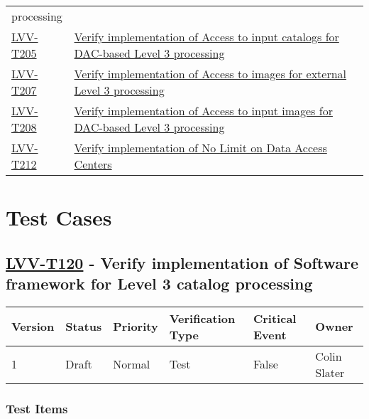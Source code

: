 \begin{longtable}[]{p{3cm}p{13cm}}
{processing}\tabularnewline
\protect\hyperlink{lvv-t205---verify-implementation-of-access-to-input-catalogs-for-dac-based-level-3-processing}{LVV-T205}
&
\href{https://jira.lsstcorp.org/secure/Tests.jspa\#/testCase/LVV-T205}{Verify
implementation of Access to input catalogs for DAC-based Level 3
processing}\tabularnewline
\protect\hyperlink{lvv-t207---verify-implementation-of-access-to-images-for-external-level-3-processing}{LVV-T207}
&
\href{https://jira.lsstcorp.org/secure/Tests.jspa\#/testCase/LVV-T207}{Verify
implementation of Access to images for external Level 3
processing}\tabularnewline
\protect\hyperlink{lvv-t208---verify-implementation-of-access-to-input-images-for-dac-based-level-3-processing}{LVV-T208}
&
\href{https://jira.lsstcorp.org/secure/Tests.jspa\#/testCase/LVV-T208}{Verify
implementation of Access to input images for DAC-based Level 3
processing}\tabularnewline
\protect\hyperlink{lvv-t212---verify-implementation-of-no-limit-on-data-access-centers}{LVV-T212}
&
\href{https://jira.lsstcorp.org/secure/Tests.jspa\#/testCase/LVV-T212}{Verify
implementation of No Limit on Data Access Centers}\tabularnewline
\bottomrule
\end{longtable}

\section{Test Cases}\label{test-cases}

\hypertarget{lvv-t120---verify-implementation-of-software-framework-for-level-3-catalog-processing}{\subsection{\texorpdfstring{\href{https://jira.lsstcorp.org/secure/Tests.jspa\#/testCase/LVV-T120}{LVV-T120}
- Verify implementation of Software framework for Level 3 catalog
processing}{LVV-T120 - Verify implementation of Software framework for Level 3 catalog processing}}\label{lvv-t120---verify-implementation-of-software-framework-for-level-3-catalog-processing}}

\begin{longtable}[]{@{}llllll@{}}
\toprule
Version & Status & Priority & Verification Type & Critical Event &
Owner\tabularnewline
\midrule
\endhead
1 & Draft & Normal & Test & False & Colin Slater\tabularnewline
\bottomrule
\end{longtable}

\subsubsection{Test Items}\label{test-items}

